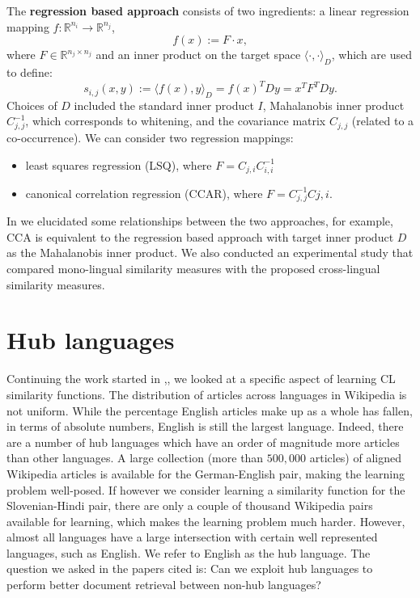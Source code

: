 \documentclass{article} %
\newcommand{\RR}{\mathbb{R}}
\begin{document}
The \textbf{regression based approach} consists of two ingredients: a linear regression mapping $f : \RR^{n_i} \rightarrow \RR^{n_j}$,$$ f(x) := F\cdot x,$$ where $F \in \RR^{n_j \times n_j}$ and an inner product on the target space $\langle \cdot, \cdot \rangle_D$, which are used to define:
$$s_{i,j}(x,y) := \langle f(x), y \rangle_D = f(x)^T D y = x^T F^T D y.$$ Choices of $D$ included the standard inner product $I$, Mahalanobis inner product $C_{j,j}^{-1}$, which corresponds to whitening, and the covariance matrix $C_{j,j}$ (related to a co-occurrence). We can consider two regression mappings:
\begin{itemize}
\item least squares regression (LSQ), where $F = C_{j,i}C_{i,i}^{-1}$
\item canonical correlation regression\cite{ccar} (CCAR), where $F = C_{j,j}^{-1}C{j,i}$.
\end{itemize}

In \cite{nips2} we elucidated some relationships between the two approaches, for example, CCA is equivalent to the regression based approach with target inner product $D$ as the Mahalanobis inner product. We also conducted an experimental study that compared mono-lingual similarity measures with the proposed cross-lingual similarity measures.


\section{Hub languages}

Continuing the work started in \cite{nips},\cite{sikdd}, we looked at a specific aspect of learning CL similarity functions. The distribution of articles across languages in Wikipedia is not uniform. While the percentage English articles make up as a whole has fallen, in terms of absolute numbers, English is still the largest language. Indeed, there are a number of hub languages which have an order of magnitude more articles than other languages. A large collection (more than $500,000$ articles) of aligned Wikipedia articles is available for the German-English pair, making the learning problem well-posed. If however we consider learning a similarity function for the Slovenian-Hindi pair, there are only a couple of thousand Wikipedia pairs available for learning, which makes the learning problem much harder. However, almost all languages have a large intersection with certain well represented languages, such as English. We refer to English as the hub language. The question we asked in the papers cited is: Can we exploit hub languages to perform better document retrieval between non-hub languages?
\end{document}
